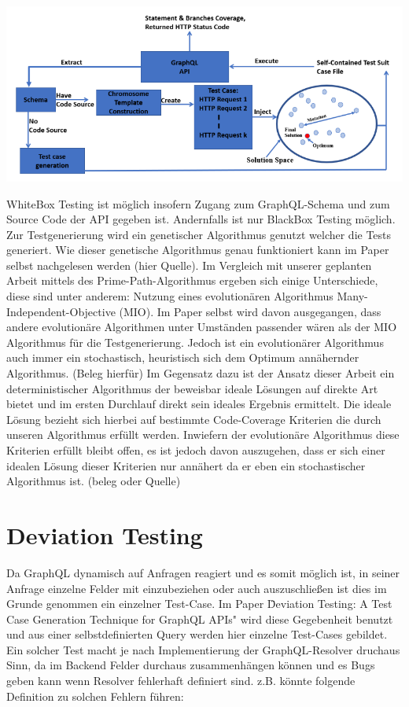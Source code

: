 \begin{center}
    \includegraphics[width=\textwidth,height=\textheight,keepaspectratio]{content/hauptteil/related Work/evomaster_framework}
\end{center}

WhiteBox Testing ist möglich insofern Zugang zum GraphQL-Schema und zum Source Code der API gegeben ist. Andernfalls ist
nur BlackBox Testing möglich. Zur Testgenerierung wird ein genetischer Algorithmus genutzt welcher die Tests generiert.
Wie dieser genetische Algorithmus genau funktioniert kann im Paper selbst nachgelesen werden (hier Quelle).
Im Vergleich mit unserer geplanten Arbeit mittels des Prime-Path-Algorithmus ergeben sich einige Unterschiede, diese sind
unter anderem: Nutzung eines evolutionären Algorithmus Many-Independent-Objective (MIO).
Im Paper selbst wird davon ausgegangen, dass andere evolutionäre Algorithmen unter Umständen passender wären als der MIO Algorithmus
für die Testgenerierung. Jedoch ist ein evolutionärer Algorithmus auch immer ein stochastisch, heuristisch sich dem Optimum annähernder Algorithmus. (Beleg hierfür)
Im Gegensatz dazu ist der Ansatz dieser Arbeit ein deterministischer Algorithmus der beweisbar ideale Lösungen auf direkte Art bietet
und im ersten Durchlauf direkt sein ideales Ergebnis ermittelt. Die ideale Lösung bezieht sich hierbei auf bestimmte
Code-Coverage Kriterien die durch unseren Algorithmus erfüllt werden.  Inwiefern der evolutionäre Algorithmus diese
Kriterien erfüllt bleibt offen, es ist jedoch davon auszugehen, dass er sich einer idealen Lösung dieser Kriterien nur
annähert da er eben ein stochastischer Algorithmus ist. (beleg oder Quelle)

\section{Deviation Testing}

Da GraphQL dynamisch auf Anfragen reagiert und es somit möglich ist, in seiner Anfrage einzelne Felder mit einzubeziehen
oder auch auszuschließen ist dies im Grunde genommen ein einzelner Test-Case.
Im Paper \" Deviation Testing: A Test Case Generation Technique for GraphQL APIs" wird diese Gegebenheit benutzt und
aus einer selbstdefinierten Query werden hier einzelne Test-Cases gebildet. Ein solcher Test macht je nach Implementierung
der GraphQL-Resolver druchaus Sinn, da im Backend Felder durchaus zusammenhängen können und es Bugs geben kann wenn
Resolver fehlerhaft definiert sind. z.B. könnte folgende Definition zu solchen Fehlern führen:

